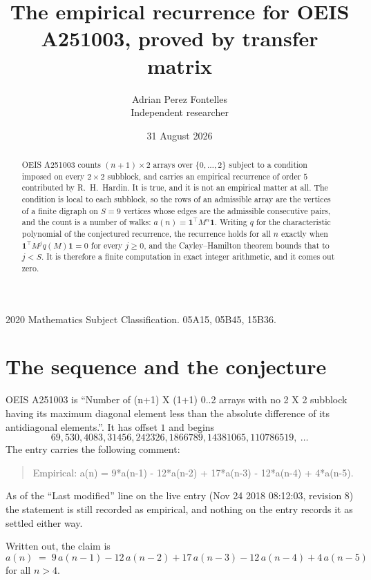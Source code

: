 \documentclass[11pt,a4paper]{article}
\title{The empirical recurrence for OEIS A251003, proved by transfer matrix}
\author{Adrian Perez Fontelles\\ \small Independent researcher}
\date{31 August 2026}
\theoremstyle{plain}
\theoremstyle{definition}
\begin{document}
\maketitle

\begin{abstract}
OEIS A251003 counts $(n+1)\times2$ arrays over $\{0,\dots,2\}$ subject to a condition imposed on
every $2\times2$ subblock, and carries an empirical recurrence of order $5$ contributed
by R.~H.~Hardin. It is true, and it is not an empirical matter at all. The condition is local
to each subblock, so the rows of an admissible array are the vertices of a finite digraph
on $S=9$ vertices whose edges are the admissible consecutive pairs, and the count is a
number of walks: $a(n)=\mathbf{1}^{\!\top}M^{n}\mathbf{1}$. Writing $q$
for the characteristic polynomial of the conjectured recurrence, the recurrence holds for all
$n$ exactly when $\mathbf{1}^{\!\top}M^{j}q(M)\mathbf{1}=0$ for every $j\ge0$, and the
Cayley--Hamilton theorem bounds that to $j<S$. It is therefore a finite computation in exact
integer arithmetic, and it comes out zero.
\end{abstract}

\noindent\small 2020 Mathematics Subject Classification. 05A15, 05B45, 15B36.\normalsize

\section{The sequence and the conjecture}

OEIS A251003 is ``Number of (n+1) X (1+1) 0..2 arrays with no 2 X 2 subblock having its maximum diagonal element less than the absolute difference of its antidiagonal elements.''. It has offset $1$ and begins
\[
69, 530, 4083, 31456, 242326, 1866789, 14381065, 110786519,\ \dots
\]
The entry carries the following comment:
\begin{quote}\small
Empirical: a(n) = 9*a(n-1) - 12*a(n-2) + 17*a(n-3) - 12*a(n-4) + 4*a(n-5).
\end{quote}
As of the ``Last modified'' line on the live entry (Nov 24 2018 08:12:03, revision 8) the statement is
still recorded as empirical, and nothing on the entry records it as settled either way.

Written out, the claim is
\begin{equation}\label{eq:conj}
a(n)\;=\;9\,a(n-1) - 12\,a(n-2) + 17\,a(n-3) - 12\,a(n-4) + 4\,a(n-5)
\end{equation}
for all $n>4$.
\end{document}

